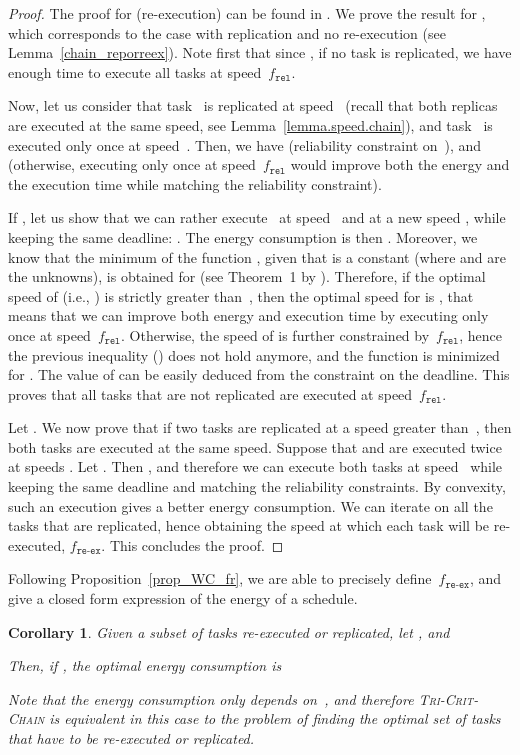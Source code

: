 \documentclass[a4paper]{article}
\theoremstyle{plain}
\newtheorem{corollary}{Corollary}
\theoremstyle{definition}
\theoremstyle{remark}
\newcommand{\fr}{\ensuremath{f_{\texttt{rel}}}\xspace}
\newcommand{\freex}{\ensuremath{f_{\texttt{re-ex}}}\xspace}
\newcommand{\chain}{\textsc{Tri-Crit-Chain}\xspace}
\begin{document}
\begin{proof}
  The proof for  (re-execution) can be found in \cite{rr7757}.
  We prove the result for , which corresponds to the case
  with replication and no re-execution (see
  Lemma~\ref{chain_reporreex}).
Note first that since , if no task is
  replicated, we have enough time to execute all tasks at speed~\fr.

  Now, let us consider that task~ is replicated at
  speed~ (recall that both replicas are executed at the same
  speed, see Lemma~\ref{lemma.speed.chain}), and task~ is executed
  only once at speed~. Then, we have
   (reliability constraint on~), and 
   (otherwise, executing  only once at speed~\fr would improve
  both the energy and the execution time while matching the
  reliability constraint).

  If , let us show that we can rather execute~ at
  speed~ and  at a new speed , while keeping the
  same deadline: .  The energy consumption is then .  Moreover, we know that the minimum of the function
  , given that  is a constant (where  and  are the
  unknowns), is obtained for  (see
  Theorem~1 by \cite{aupy12ccpe}).  Therefore, if the optimal speed of
   (i.e., ) is strictly greater than~, then the optimal
  speed for  is , that means that we
  can improve both energy and execution time by executing  only
  once at speed~\fr.  Otherwise, the speed of  is further
  constrained by~\fr, hence the previous inequality () does not hold anymore, and the function is
  minimized for . The value of  can be easily deduced
  from the constraint on the deadline.  This proves that all tasks
  that are not replicated are executed at speed~\fr.

  Let . We now prove that if two
  tasks are replicated at a speed greater than~, then both tasks
  are executed at the same speed. Suppose that  and  are executed twice at speeds . Let .
  Then , and therefore we can execute
  both tasks at speed~ while keeping the same deadline and
  matching the reliability constraints. By convexity, such an
  execution gives a better energy consumption. We can iterate on all
  the tasks that are replicated, hence obtaining the speed at which
  each task will be re-executed, \freex. This concludes the proof.
\end{proof}


Following Proposition~\ref{prop_WC_fr}, we are able to precisely
define~\freex, and give a closed form expression of the energy of a
schedule. 
\begin{corollary}
  \label{cor.energy.chain}
Given a subset  of tasks re-executed or replicated, let 
, and 

Then, if ,  
the optimal energy consumption is 


Note that the energy consumption only depends on~, and therefore
\chain is equivalent in this case
to the problem of finding the optimal set of tasks that have to be
re-executed or replicated.
\end{corollary}
\end{document}
